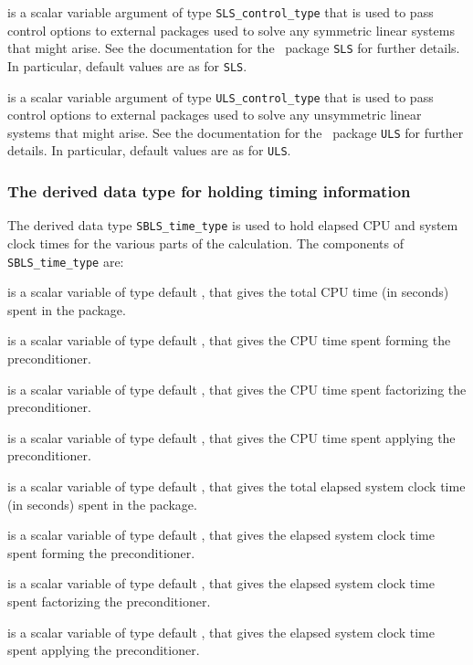 \documentclass{galahad}
\newcommand{\packagename}{SBLS}
\begin{document}
\begin{description}
 is a scalar variable argument of type
{\tt SLS\_control\_type} that is used to pass control
options to external packages used to solve any symmetric
linear systems that might arise.
See the documentation for the \galahad\ package {\tt SLS} for further details.
In particular, default values are as for {\tt SLS}.

 is a scalar variable argument of type
{\tt ULS\_control\_type} that is used to pass control
options to external packages used to solve any unsymmetric
linear systems that might arise.
See the documentation for the \galahad\ package {\tt ULS} for further details.
In particular, default values are as for {\tt ULS}.

\end{description}


\subsubsection{The derived data type for holding timing
 information}\label{typetime}
The derived data type
{\tt \packagename\_time\_type}
is used to hold elapsed CPU and system clock times for the various parts
of the calculation. The components of
{\tt \packagename\_time\_type}
are:
\begin{description}
 is a scalar variable of type default \realdp, that gives
 the total CPU time (in seconds) spent in the package.

 is a scalar variable of type default \realdp, that gives
 the CPU time spent forming the preconditioner.

 is a scalar variable of type default \realdp, that gives
 the CPU time spent factorizing the preconditioner.

 is a scalar variable of type default \realdp, that gives
 the CPU time spent applying the preconditioner.

 is a scalar variable of type default \realdp, that gives
 the total elapsed system clock time (in seconds) spent in the package.

 is a scalar variable of type default \realdp, that gives
 the  elapsed system clock time spent forming the preconditioner.

 is a scalar variable of type default \realdp, that gives
 the elapsed system clock time spent factorizing the preconditioner.

 is a scalar variable of type default \realdp, that gives
 the elapsed system clock time spent applying the preconditioner.

\end{description}
\end{document}
